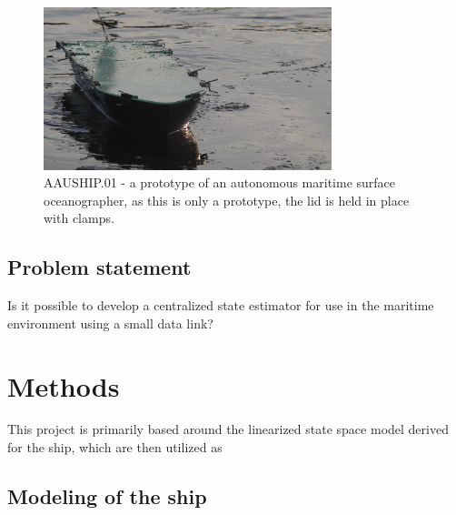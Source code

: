 \documentclass[journal]{IEEEtran}
\begin{document}
\begin{figure}
	\begin{center}
		\includegraphics[width=8.4cm]{img/aauship.png} %
		\caption{AAUSHIP.01 - a prototype of an autonomous maritime surface oceanographer, as this is only a prototype, the lid is held in place with clamps. }  
		\label{fig:ship}
	\end{center}
\end{figure}

\subsection{Problem statement}
Is it possible to develop a centralized state estimator for use in the maritime environment using a small data link?

\section{Methods}

This project is primarily based around the linearized state space model derived for the ship, which are then utilized as 

\subsection{Modeling of the ship}
\end{document}
